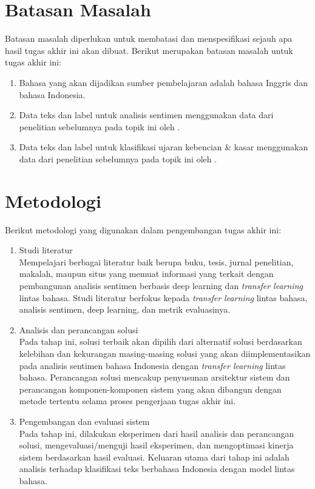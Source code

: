 \section{Batasan Masalah}

Batasan masalah diperlukan untuk membatasi dan menspesifikasi sejauh apa hasil tugas akhir ini akan dibuat. Berikut merupakan batasan masalah untuk tugas akhir ini:
\begin{enumerate}
	\item Bahasa yang akan dijadikan sumber pembelajaran adalah bahasa Inggris dan bahasa Indonesia.
	\item Data teks dan label untuk analisis sentimen menggunakan data dari penelitian sebelumnya pada topik ini oleh \parencite{CrisdayantiPurwarianti2019}.
	\item Data teks dan label untuk klasifikasi ujaran kebencian \& kasar menggunakan data dari penelitian sebelumnya pada topik ini oleh \parencite{Ibrohim_Budi_2019}.
\end{enumerate}

\section{Metodologi}

Berikut metodologi yang digunakan dalam pengembangan tugas akhir ini:
\begin{enumerate}
	\item Studi literatur \\
	Mempelajari berbagai literatur baik berupa buku, tesis, jurnal penelitian, makalah, maupun situs yang memuat informasi yang terkait dengan pembangunan analisis sentimen berbasis deep learning dan \textit{transfer learning} lintas bahasa. Studi literatur berfokus kepada \textit{transfer learning} lintas bahasa, analisis sentimen, deep learning, dan metrik evaluasinya.

	\item Analisis dan perancangan solusi \\
	Pada tahap ini, solusi terbaik akan dipilih dari alternatif solusi berdasarkan kelebihan dan kekurangan masing-masing solusi yang akan diimplementasikan pada analisis sentimen bahasa Indonesia dengan \textit{transfer learning} lintas bahasa. Perancangan solusi mencakup penyusunan arsitektur sistem dan perancangan komponen-komponen sistem yang akan dibangun dengan metode tertentu selama proses pengerjaan tugas akhir ini.

	\item Pengembangan dan evaluasi sistem \\
	Pada tahap ini, dilakukan eksperimen dari hasil analisis dan perancangan solusi, mengevaluasi/menguji  hasil eksperimen, dan mengoptimasi kinerja sistem berdasarkan hasil evaluasi. Keluaran utama dari tahap ini adalah analisis terhadap klasifikasi teks berbahasa Indonesia dengan model lintas bahasa.
\end{enumerate}

